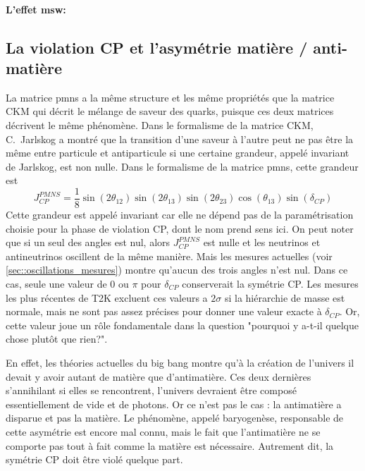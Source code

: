             \paragraph{L'effet \gls{msw}:} 
        \subsection{La violation CP et l'asymétrie matière / anti-matière}\label{sec::CP_violation}
            La matrice \gls{pmns} a la même structure et les même propriétés que la matrice CKM qui décrit le mélange de saveur des quarks, puisque ces deux matrices décrivent le même phénomène. Dans le formalisme de la matrice CKM, C.~Jarlskog a montré que la transition d'une saveur à l'autre peut ne pas être la même entre particule et antiparticule si une certaine grandeur, appelé invariant de Jarlskog, est non nulle\cite{Jarlskog1985}. Dans le formalisme de la matrice \gls{pmns}, cette grandeur est
            \begin{equation}
                J_{CP}^{PMNS}=\frac{1}{8}\sin(2\theta_{12})\sin(2\theta_{13})\sin(2\theta_{23})\cos(\theta_{13})\sin(\delta_{CP})
            \end{equation}
            Cette grandeur est appelé invariant car elle ne dépend pas de la paramétrisation choisie pour la phase de violation CP, dont le nom prend sens ici. On peut noter que si un seul des angles est nul, alors $J_{CP}^{PMNS}$ est nulle et les neutrinos et antineutrinos oscillent de la même manière. Mais les mesures actuelles (voir \autoref{sec::oscillations_mesures}) montre qu'aucun des trois angles n'est nul. Dans ce cas, seule une valeur de $0$ ou $\pi$ pour $\delta_{CP}$ conserverait la symétrie CP. Les mesures les plus récentes de T2K excluent ces valeurs a $2\sigma$\cite{Abe2018} si la hiérarchie de masse est normale, mais ne sont pas assez précises pour donner une valeur exacte à $\delta_{CP}$. Or, cette valeur joue un rôle fondamentale dans la question "pourquoi y a-t-il quelque chose plutôt que rien?".
            
            En effet, les théories actuelles du big bang\cite{ref needed} montre qu'à la création de l'univers il devait y avoir autant de matière que d'antimatière. Ces deux dernières s'annihilant si elles se rencontrent, l'univers devraient être composé essentiellement de vide et de photons. Or ce n'est pas le cas : la antimatière a disparue et pas la matière. Le phénomène, appelé baryogenèse, responsable de cette asymétrie est encore mal connu, mais le fait que l'antimatière ne se comporte pas tout à fait comme la matière est nécessaire\cite{Sakharov1991}. Autrement dit, la symétrie CP doit être violé quelque part.
            
